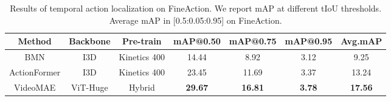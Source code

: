 \begin{table}[t]
\centering
\caption{ Results of temporal action localization on FineAction. We report mAP at different tIoU thresholds. Average mAP in [0.5:0.05:0.95] on FineAction.}
\begin{tabular}{c|c|c|cccc }
\hline
 \textbf{Method} &\textbf{Backbone} &\textbf{Pre-train} &\textbf{mAP@0.50}& \textbf{mAP@0.75}& \textbf{mAP@0.95} & \textbf{Avg.mAP} \\
\hline 
BMN \cite{lin2019bmn} & I3D & Kinetics 400  & 14.44&	8.92&	3.12&	9.25\\
ActionFormer \cite{zhang2022actionformer} &I3D & Kinetics 400  & 23.45 & 11.69& 3.37 & 13.24 \\
VideoMAE&ViT-Huge & Hybrid & \textbf{29.67} & \textbf{16.81} & \textbf{3.78} & \textbf{17.56}  \\
\hline
\end{tabular}
\label{tab:SOAT_fineaction}
\vspace{-2mm}
\end{table}
